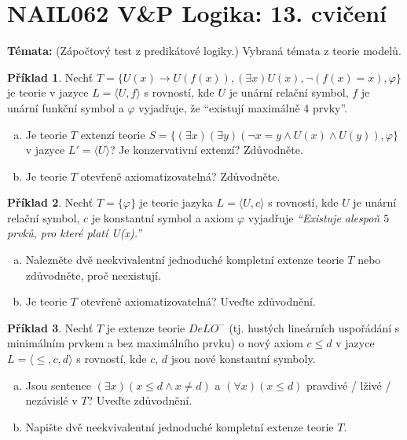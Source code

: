 \documentclass[a4paper]{article}
\theoremstyle{definition}
\newtheorem{problem}{Příklad}
\begin{document}
\section*{NAIL062 V\&P Logika: 13. cvičení}


\textbf{Témata:}
(Zápočtový test z predikátové logiky.) Vybraná témata z teorie modelů.


\medskip\begin{problem}
    Nechť $T = \{U(x) \to U(f(x)), (\exists x)U(x), \neg (f(x) = x), \varphi\}$ je teorie v jazyce $L = \langle U, f \rangle$ s rovností, kde $U$ je unární relační symbol, $f$ je unární funkční symbol a $\varphi$ vyjadřuje, že ``existují maximálně 4 prvky''.
    \begin{enumerate}[(a)]
    \item Je teorie $T$ extenzí teorie $S = \{ (\exists x)(\exists y)(\neg x = y \land U(x) \land U(y)), \varphi \}$ v jazyce $L' = \langle U \rangle$? Je konzervativní extenzí? Zdůvodněte.
    \item Je teorie $T$ otevřeně axiomatizovatelná? Zdůvodněte.
    \end{enumerate} 
\end{problem}

\medskip\begin{problem}
Nechť $T=\{\varphi\}$ je teorie jazyka $L=\langle U, c \rangle$ s rovností, kde $U$ je unární relační symbol, $c$ je konstantní symbol a axiom $\varphi$ vyjadřuje \emph{``Existuje alespoň $5$ prvků, pro které platí U(x).''}
\begin{enumerate}[(a)]
\item Nalezněte dvě neekvivalentní jednoduché kompletní extenze teorie $T$ nebo zdůvodněte, proč neexistují.
\item Je teorie $T$ otevřeně axiomatizovatelná? Uveďte zdůvodnění.
\end{enumerate}
\end{problem}


\medskip\begin{problem}
    Nechť $T$ je extenze teorie $DeLO^-$ (tj. hustých lineárních uspořádání s minimálním prvkem a bez maximálního prvku) o nový axiom $c \le d$ v jazyce $L=\langle \le,c,d\rangle$ s rovností, kde $c$, $d$ jsou nové konstantní symboly.
    \begin{enumerate}[(a)]
    \item Jsou sentence $(\exists x)(x\le d \wedge x \ne d)$ a $(\forall x)(x \le d)$ pravdivé / lživé / nezávislé v $T$? Uveďte zdůvodnění.
    \item Napište dvě neekvivalentní jednoduché kompletní extenze teorie $T$.
    \end{enumerate} 
\end{problem}
\end{document}

